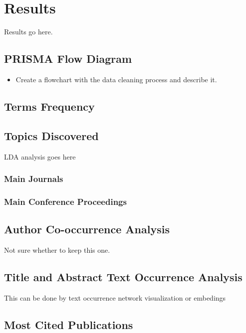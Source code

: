 \documentclass[parskip=full]{scrartcl}
\begin{document}
\section{Results}

Results go here.

\subsection{PRISMA Flow Diagram}

\begin{itemize}
    \item Create a flowchart with the data cleaning process and describe it.
\end{itemize}

\subsection{Terms Frequency}

\subsection{Topics Discovered}

LDA analysis goes here

\subsubsection{Main Journals}

\subsubsection{Main Conference Proceedings}

\subsection{Author Co-occurrence Analysis}

Not sure whether to keep this one.

\subsection{Title and Abstract Text Occurrence Analysis}

This can be done by text occurrence network visualization or embedings

\subsection{Most Cited Publications}
\end{document}
